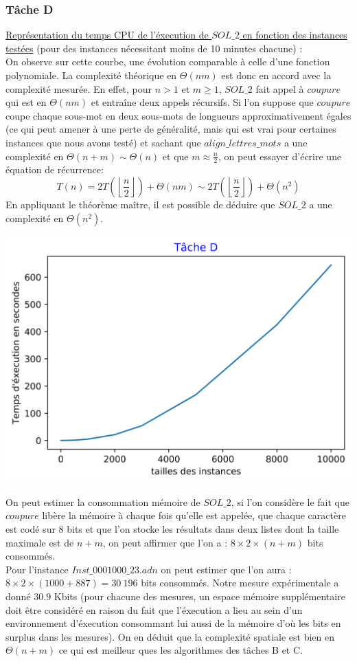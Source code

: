 \documentclass[12pt, a4paper]{report}
\begin{document}
\subsubsection{Tâche D}
\underline{Représentation du temps CPU de l'éxecution de $SOL\_2$ en fonction des instances testées} (pour des instances nécessitant moins de 10 minutes chacune) :\\
On observe sur cette courbe, une évolution comparable à celle d'une fonction polynomiale. La complexité théorique en $\Theta(nm)$ est donc en accord avec la complexité mesurée. En effet, pour $n>1$ et $m\geq 1$, $SOL\_2$ fait appel à $coupure$ qui est en $\Theta(nm)$ et entraîne deux appels récursifs. Si l'on suppose que $coupure$ coupe chaque sous-mot en deux sous-mots de longueurs approximativement égales (ce qui peut amener à une perte de généralité, mais qui est vrai pour certaines instances que nous avons testé) et sachant que $align\_lettres\_mots$ a une complexité en $\Theta(n+m) \sim \Theta(n)$ et que $m\approx \frac{n}{2}$, on peut essayer d'écrire une équation de récurrence: $$T(n)=2T(\left \lfloor \frac{n}{2} \right \rfloor)+\Theta(nm) \sim 2T(\left \lfloor \frac{n}{2} \right \rfloor)+\Theta(n^{2})$$
En appliquant le théorème maître, il est possible de déduire que $SOL\_2$ a une complexité en $\Theta(n^{2})$.
\begin{center}
\includegraphics[scale=0.75]{TD.png}
\end{center}
On peut estimer la consommation mémoire de $SOL\_2$, si l'on considère le fait que $coupure$ libère la mémoire à chaque fois qu'elle est appelée, que chaque caractère est codé sur 8 bits et que l'on stocke les résultats dans deux listes dont la taille maximale est de $n+m$, on peut affirmer que l'on a : $8 \times 2 \times (n+m)$ bits consommés.\\
Pour l'instance $Inst\_0001000\_23.adn$ on peut estimer que l'on aura :\\ $8 \times 2 \times (1000+887)=30\ 196$ bits consommés. Notre mesure expérimentale a donné $30.9$ Kbits (pour chacune des mesures, un espace mémoire supplémentaire doit être considéré en raison du fait que l'éxecution a lieu au sein d'un environnement d'éxecution consommant lui aussi de la mémoire d'où les bits en surplus dans les mesures). On en déduit que la complexité spatiale est bien en $\Theta(n+m)$ ce qui est meilleur ques les algorithmes des tâches B et C.
\end{document}
